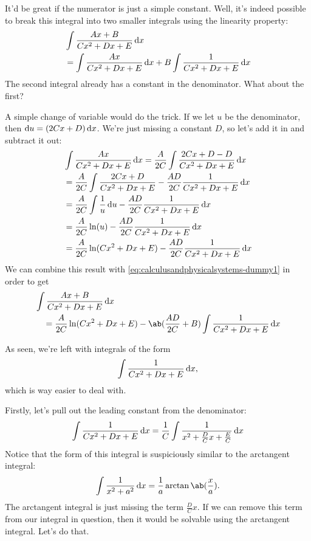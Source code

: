 It'd be great if the numerator is just a simple constant. Well, it's indeed possible to break this integral into two smaller integrals using the linearity property:
\begin{align}
	 & \int \frac{Ax + B}{Cx^2 + Dx + E} \odif{x}                                                                                         \nonumber \\
	 & = \int \frac{Ax}{Cx^2 + Dx + E} \odif{x} + B \int \frac{1}{Cx^2 + Dx + E} \odif{x} \label{eq:calculusandphysicalsystems-dummy1}
\end{align}
The second integral already has a constant in the denominator. What about the first?

A simple change of variable would do the trick. If we let \(u\) be the denominator, then \(\odif{u} = (2Cx + D) \odif{x}\). We're just missing a constant \(D\), so let's add it in and subtract it out:
\begin{align}
	 & \int \frac{Ax}{Cx^2 + Dx + E} \odif{x} = \frac{A}{2C} \int \frac{2Cx + D - D}{Cx^2 + Dx + E} \odif{x} \nonumber \\
	 & = \frac{A}{2C} \int \frac{2Cx + D}{Cx^2 + Dx + E} - \frac{AD}{2C}\frac{1}{Cx^2 + Dx + E}\odif{x}                \\
	 & = \frac{A}{2C} \int \frac{1}{u}\odif{u} - \frac{AD}{2C}\frac{1}{Cx^2 + Dx + E}\odif{x}                          \\
	 & = \frac{A}{2C}\ln(u) - \frac{AD}{2C}\frac{1}{Cx^2 + Dx + E}\odif{x}                                             \\
	 & = \frac{A}{2C}\ln(Cx^2 + Dx + E) - \frac{AD}{2C}\frac{1}{Cx^2 + Dx + E}\odif{x}
\end{align}
We can combine this result with \cref{eq:calculusandphysicalsystems-dummy1} in order to get
\begin{equation}
	\begin{multlined}
		\int \frac{Ax + B}{Cx^2 + Dx + E} \odif{x} \\= \frac{A}{2C}\ln(Cx^2 + Dx + E) - \ab(\frac{AD}{2C} + B) \int \frac{1}{Cx^2 + Dx + E} \odif{x}
	\end{multlined}
\end{equation}

As seen, we're left with integrals of the form
\begin{equation}
	\int \frac{1}{Cx^2 + Dx + E}\odif{x},
\end{equation}
which is way easier to deal with.

Firstly, let's pull out the leading constant from the denominator:
\begin{equation}
	\int \frac{1}{Cx^2 + Dx + E}\odif{x} = \frac{1}{C}\int\frac{1}{x^2 + \frac{D}{C}x + \frac{E}{C}}\odif{x}
\end{equation}
Notice that the form of this integral is suspiciously similar to the arctangent integral:
\begin{equation}
	\int \frac{1}{x^2 + a^2} \odif{x} = \frac{1}{a}\arctan\ab(\frac{x}{a}).
\end{equation}
The arctangent integral is just missing the term \(\frac{D}{C}x\). If we can remove this term from our integral in question, then it would be solvable using the arctangent integral. Let's do that.

